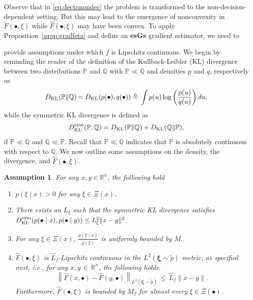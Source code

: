 \documentclass[11pt,reqno]{amsart}
\newcommand{\1}{{\bf 1}}
\newcommand{\2}{{\bf 2}}
\newcommand{\mr}[1]{{\color{blue}#1}}
\newcommand{\pc}[1]{{\color{cyan}#1}}
\newcommand{\us}[1]{\textcolor{red}{#1}}
\newcommand{\bxi}{\boldsymbol{\xi}}
\newcommand{\R}{\mathbb R}
\newcommand{\lnn}{\left\|}
\newcommand{\rnn}{\right\|}
\numberwithin{equation}{section}
\newtheorem{assumption}{Assumption}[section]
\theoremstyle{remark}
\begin{document}
{			Observe that in \eqref{eq:dectonondec} the problem is transformed to the non-decision-dependent setting.  But this
			may lead to the emergence of nonconvexity in
			$\tilde{F}(\bullet,\xi)$ while $\hat{F}(\bullet,\xi)$ may have been
			convex. To apply Proposition~\ref{prop:gradfeta} and define an \textbf{esGs} gradient estimator, we need to {provide assumptions under which $f$ is Lipschitz continuous. We begin by reminding the reader of the definition of the Kullback-Leibler (KL) divergence between two distributions $\mathbb{P}$ and $\mathbb{Q}$ with $\mathbb{P} \ll \mathbb{Q}$ and densities $p$ and $q$, respectively as 
				\begin{equation}
					D_{{\textnormal{KL}}}(\mathbb{P}  \|  \mathbb{Q}) \, 
					{ = D_{\textnormal{KL}}(p(\bullet), q(\bullet))}
					\triangleq \, \int p(u) \log \left(\frac{p(u)}{q(u)}\right) du,
				\end{equation}
				while the symmetric KL divergence is defined as 
				{\begin{equation}
						D_{{\textnormal{KL}}}^{{\rm sym}}(\mathbb{P},\mathbb{Q}) =	D_{{\textnormal{KL}}}(\mathbb{P} \| \mathbb{Q})+	D_{{\textnormal{KL}}}(\mathbb{Q} \| \mathbb{P}),
				\end{equation}}
				if $\mathbb{P} \ll \mathbb{Q}$ and $\mathbb{Q} \ll \mathbb{P}$. Recall that $\mathbb{P} \ll \mathbb{Q}$ indicates that $\mathbb{P}$ is absolutely continuous with respect to $\mathbb{Q}$.
				We now outline some assumptions on the density, the divergence, and $\hat{F}(\bullet,\xi)$. %
				\begin{assumption}\label{asm:decdep}
					For any $x,y\in\R^n$, the following hold 
					\begin{enumerate}
						\item $p(\xi \mid x)>0$ for any $\xi\in\Xi(x)$.
						\item\label{ass:p-x-y-dist} There exists an $L_\xi$ such that the {symmetric KL divergence} satisfies $D_{{\textnormal{KL}}}^{{\rm sym}}(p(\bullet \mid x) , p(\bullet \mid y)) \leq L_\xi^2\|x-y\|^2$. %
						\item\label{ass:p-ratio-bnd} For any $\xi\in\Xi(x)$, $\frac{p(\xi \mid x)}{\tilde{p}(\xi)}$ is uniformly bounded by $M$.
						\item\label{ass:f-hat-Lip} $\hat{F}(\bullet,\xi)$ is $\hat{L}_f$-Lipschitz continuous in the $L^2(\bxi \sim \tilde{p})$ metric, as specified next, i.e., for any $x, y \, \in \, \R^n$, the following holds.
						$$
						{\lnn \hat{F}(x, \bullet) - \hat{F}(y, \bullet) \rnn}_{L^2(\bxi \sim \tilde{p})} \, \leq \, \hat{L}_f \|x-y\|.
						$$
						Furthermore, $\hat{F}(\bullet,\xi)$ is bounded by $M_f$ for almost every $\xi\in\Xi(\bullet)$. 
					\end{enumerate}
				\end{assumption}
				
}}
\end{document}
